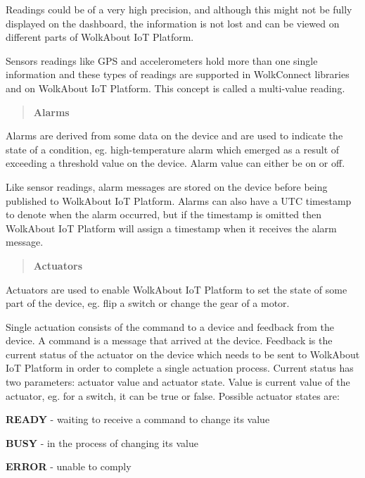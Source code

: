 Readings could be of a very high precision, and although this might not be fully displayed on the dashboard, the information is not lost and can be viewed on different parts of Wolk\+About IoT Platform.

Sensors readings like G\+PS and accelerometers hold more than one single information and these types of readings are supported in Wolk\+Connect libraries and on Wolk\+About IoT Platform. This concept is called a multi-\/value reading.

\label{_alarms}%
 \begin{quote}
{\bfseries Alarms} \end{quote}
Alarms are derived from some data on the device and are used to indicate the state of a condition, eg. high-\/temperature alarm which emerged as a result of exceeding a threshold value on the device. Alarm value can either be on or off.

Like sensor readings, alarm messages are stored on the device before being published to Wolk\+About IoT Platform. Alarms can also have a U\+TC timestamp to denote when the alarm occurred, but if the timestamp is omitted then Wolk\+About IoT Platform will assign a timestamp when it receives the alarm message.

\label{_actuators}%
 \begin{quote}
{\bfseries Actuators} \end{quote}
Actuators are used to enable Wolk\+About IoT Platform to set the state of some part of the device, eg. flip a switch or change the gear of a motor.

Single actuation consists of the command to a device and feedback from the device. A command is a message that arrived at the device. Feedback is the current status of the actuator on the device which needs to be sent to Wolk\+About IoT Platform in order to complete a single actuation process. Current status has two parameters\+: actuator value and actuator state. Value is current value of the actuator, eg. for a switch, it can be true or false. Possible actuator states are\+:


\begin{DoxyItemize}
\item {\bfseries R\+E\+A\+DY} -\/ waiting to receive a command to change its value
\item {\bfseries B\+U\+SY} -\/ in the process of changing its value
\item {\bfseries E\+R\+R\+OR} -\/ unable to comply
\end{DoxyItemize}

